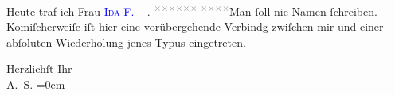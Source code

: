 \pstart
           Heute traf ich Frau \textsc{\textcolor{blue}{Ida {\pb}F.}{}\ledrightnote{\textcolor{blue}{Ida Falk}}} – \label{K_L02967-10v}\label{K_L02967-10h}. \substVorne{}\textsuperscript{\textcolor{gray}{×}\-\textcolor{gray}{×}\-\textcolor{gray}{×}\-\textcolor{gray}{×}\-\textcolor{gray}{×}\-\textcolor{gray}{×}{ }\textcolor{gray}{×}\-\textcolor{gray}{×}\-\textcolor{gray}{×}\-\textcolor{gray}{×}}\substDazwischen{}Man ſoll nie Namen ſchreiben\substHinten{}. – Komiſcherweiſe iſt \introOben{}hier\introOben{} eine vorübergehende
               Verbindg zwiſchen mir und einer abſoluten Wiederholung jenes Typus eingetreten. –\pend
           
\pstart
           Herzlichſt Ihr {\\[\baselineskip]}\spacefill\mbox{A. S.}\pend
           \leftskip=0em{}\endnumbering{}  
      